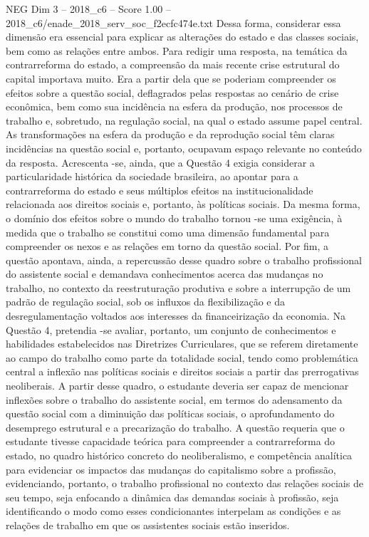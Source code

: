 \begin{textsample}{NEG Dim 3 – 2018\_c6 – Score 1.00 – 2018\_c6/enade\_2018\_serv\_soc\_f2ecfc474e.txt}
Dessa forma, considerar essa dimensão era essencial para explicar as alterações do estado e das classes sociais, bem como as relações entre ambos.
Para redigir uma resposta, na temática da contrarreforma do estado, a compreensão da mais recente crise estrutural do capital importava muito.
Era a partir dela que se poderiam compreender os efeitos sobre a questão social, deflagrados pelas respostas ao cenário de crise econômica, bem como sua incidência na esfera da produção, nos processos de trabalho e, sobretudo, na regulação social, na qual o estado assume papel central.
As transformações na esfera da produção e da reprodução social têm claras incidências na questão social e, portanto, ocupavam espaço relevante no conteúdo da resposta.
Acrescenta -se, ainda, que a Questão 4 exigia considerar a particularidade histórica da sociedade brasileira, ao apontar para a contrarreforma do estado e seus múltiplos efeitos na institucionalidade relacionada aos direitos sociais e, portanto, às políticas sociais.
Da mesma forma, o domínio dos efeitos sobre o mundo do trabalho tornou -se uma exigência, à medida que o trabalho se constitui como uma dimensão fundamental para compreender os nexos e as relações em torno da questão social.
Por fim, a questão apontava, ainda, a repercussão desse quadro sobre o trabalho profissional do assistente social e demandava conhecimentos acerca das mudanças no trabalho, no contexto da reestruturação produtiva e sobre a interrupção de um padrão de regulação social, sob os influxos da flexibilização e da desregulamentação voltados aos interesses da financeirização da economia.
Na Questão 4, pretendia -se avaliar, portanto, um conjunto de conhecimentos e habilidades estabelecidos nas Diretrizes Curriculares, que se referem diretamente ao campo do trabalho como parte da totalidade social, tendo como problemática central a inflexão nas políticas sociais e direitos sociais a partir das prerrogativas neoliberais.
A partir desse quadro, o estudante deveria ser capaz de mencionar inflexões sobre o trabalho do assistente social, em termos do adensamento da questão social com a diminuição das políticas sociais, o aprofundamento do desemprego estrutural e a precarização do trabalho.
A questão requeria que o estudante tivesse capacidade teórica para compreender a contrarreforma do estado, no quadro histórico concreto do neoliberalismo, e competência analítica para evidenciar os impactos das mudanças do capitalismo sobre a profissão, evidenciando, portanto, o trabalho profissional no contexto das relações sociais de seu tempo, seja enfocando a dinâmica das demandas sociais à profissão, seja identificando o modo como esses condicionantes interpelam as condições e as relações de trabalho em que os assistentes sociais estão inseridos.

\end{textsample}
